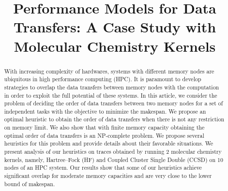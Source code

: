 \documentclass[runningheads]{llncs} %
\begin{document}
	\title{Performance Models for Data Transfers: A Case Study with Molecular Chemistry Kernels}
	\author{}
	\maketitle              %
	\begin{abstract} 

With increasing complexity of hardwares, systems with different memory nodes are ubiquitous in high performance computing (HPC). It is paramount to develop strategies to overlap the data transfers between memory nodes with the computation in order to exploit the full potential of these systems. In this article, we consider the problem of deciding the  order of data transfers between two memory nodes for a set of independent tasks  with the objective to minimize the makespan. We propose an optimal heuristic to obtain the order of data transfers when there is not any restriction on memory limit. We also show that with finite memory capacity obtaining the optimal order of data transfers is an NP-complete problem. We propose several heuristics for this problem and provide details about their favorable situations. We present analysis of our heuristics on traces obtained by running 2 molecular chemistry kernels, namely, Hartree–Fock (HF)  and Coupled Cluster Single Double (CCSD) on 10 nodes of an HPC system. Our results show that some of our heuristics achieve significant overlap for moderate memory capacities and are very close to the lower bound of makespan.

	\end{abstract} %
\end{document}
